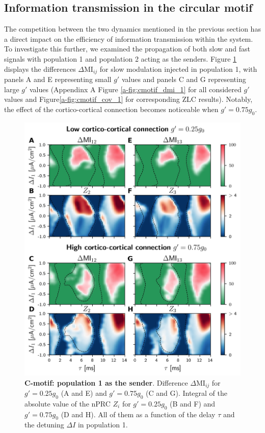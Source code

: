 \documentclass[../main.tex]{subfiles}
\begin{document}
\subsection{Information transmission in the circular motif}
The competition between the two dynamics mentioned in the previous section has a direct impact on the efficiency of information transmission within the system.
To investigate this further, we examined the propagation of both slow and fast signals with population 1 and population 2 acting as the senders.
Figure \ref{fig:cmotif_signal_1} displays the differences $\Delta$MI$_{ij}$ for slow modulation injected in population 1, with panels A and E representing small $g'$ values and panels C and G representing large $g'$ values (Appendinx A Figure \ref{a-fig:cmotif_dmi_1} for all considered $g'$ values and Figure\ref{a-fig:cmotif_cov_1} for corresponding ZLC results).
Notably, the effect of the cortico-cortical connection becomes noticeable when $g' = 0.75 g_0$.
\begin{figure}[!htb]
 \centering
    \includegraphics[width=\textwidth]{chapter2/figures/fig6}
    \caption{\textbf{C-motif: population 1 as the sender}.
    Difference $\Delta$MI$_{ij}$ for $g'=0.25g_0$ (A and E) and $g'=0.75g_0$ (C and G).
    Integral of the absolute value of the nPRC $Z_i$ for $g'=0.25g_0$ (B and F) and $g' = 0.75g_0$ (D and H).
    All of them as a function of the delay $\tau$ and the detuning $\Delta I$ in population 1.}
    \label{fig:cmotif_signal_1}
\end{figure}
\end{document}
